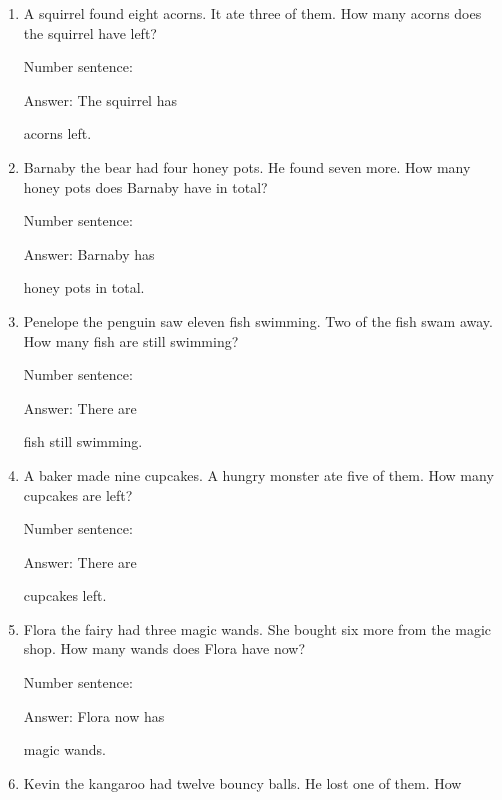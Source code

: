 \documentclass{tufte-book}
\begin{document}
\begin{enumerate}

\item
  A squirrel found eight acorns. It ate three of them. How many acorns
  does the squirrel have left?\medskip\par
  Number sentence:
  \dotfill\medskip\par
  Answer: The squirrel has
  \dotfill\medskip\par\mbox{}\dotfill\medskip\par\mbox{}\dotfill\bigskip
  acorns left.
\item
  Barnaby the bear had four honey pots. He found seven more. How many
  honey pots does Barnaby have in total?\medskip\par
  Number sentence:
  \dotfill\medskip\par
  Answer: Barnaby has
  \dotfill\medskip\par\mbox{}\dotfill\medskip\par\mbox{}\dotfill\bigskip
  honey pots in total.
\item
  Penelope the penguin saw eleven fish swimming. Two of the fish swam
  away. How many fish are still swimming?\medskip\par
  Number sentence:
  \dotfill\medskip\par
  Answer: There are
  \dotfill\medskip\par\mbox{}\dotfill\medskip\par\mbox{}\dotfill\bigskip
  fish still swimming.
\item
  A baker made nine cupcakes. A hungry monster ate five of them. How
  many cupcakes are left?\medskip\par
  Number sentence:
  \dotfill\medskip\par
  Answer: There are
  \dotfill\medskip\par\mbox{}\dotfill\medskip\par\mbox{}\dotfill\bigskip
  cupcakes left.
\item
  Flora the fairy had three magic wands. She bought six more from the
  magic shop. How many wands does Flora have now?\medskip\par
  Number sentence:
  \dotfill\medskip\par
  Answer: Flora now has
  \dotfill\medskip\par\mbox{}\dotfill\medskip\par\mbox{}\dotfill\bigskip
  magic wands.
\item
  Kevin the kangaroo had twelve bouncy balls. He lost one of them. How

\end{enumerate}
\end{document}

